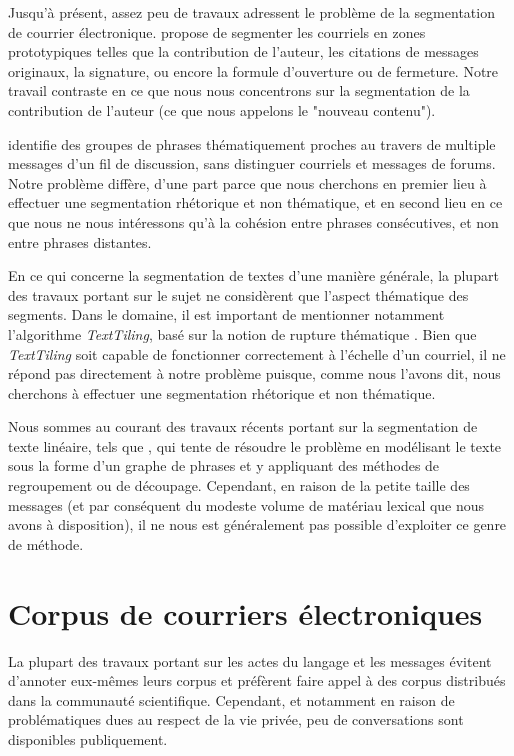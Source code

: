 Jusqu'à présent, assez peu de travaux adressent le problème de la segmentation de courrier électronique. \cite{lampert:2009:emnlp} propose de segmenter les courriels en zones prototypiques telles que la contribution de l'auteur, les citations de messages originaux, la signature, ou encore la formule d'ouverture ou de fermeture. Notre travail contraste en ce que nous nous concentrons sur la segmentation de la contribution de l'auteur (ce que nous appelons le "nouveau contenu").

\cite{joty:2013:jair} identifie des groupes de phrases thématiquement proches au travers de multiple messages d'un fil de discussion, sans distinguer courriels et messages de forums. Notre problème diffère, d'une part parce que nous cherchons en premier lieu à effectuer une segmentation rhétorique et non thématique, et en second lieu en ce que nous ne nous intéressons qu'à la cohésion entre phrases consécutives, et non entre phrases distantes.

En ce qui concerne la segmentation de textes d'une manière générale, la plupart des travaux portant sur le sujet ne considèrent que l'aspect thématique des segments. Dans le domaine, il est important de mentionner notamment l'algorithme \textit{TextTiling}, basé sur la notion de rupture thématique \cite{hearst1997texttiling}. Bien que \textit{TextTiling} soit capable de fonctionner correctement à l'échelle d'un courriel, il ne répond pas directement à notre problème puisque, comme nous l'avons dit, nous cherchons à effectuer une segmentation rhétorique et non thématique.

Nous sommes au courant des travaux récents portant sur la segmentation de texte linéaire, tels que \cite{kazantseva:2011}, qui tente de résoudre le problème en modélisant le texte sous la forme d'un graphe de phrases et y appliquant des méthodes de regroupement ou de découpage. Cependant, en raison de la petite taille des messages (et par conséquent du modeste volume de matériau lexical que nous avons à disposition), il ne nous est généralement pas possible d'exploiter ce genre de méthode.

\section{Corpus de courriers électroniques}

La plupart des travaux portant sur les actes du langage et les messages évitent d'annoter eux-mêmes leurs corpus et préfèrent faire appel à des corpus distribués dans la communauté scientifique. Cependant, et notamment en raison de problématiques dues au respect de la vie privée, peu de conversations sont disponibles publiquement.

